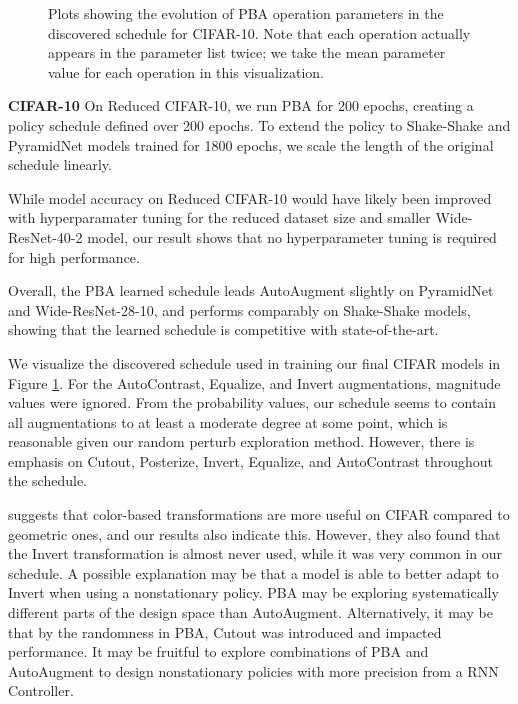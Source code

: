 \documentclass{article}
\begin{document}
\begin{figure}[t]
  \centering
  \begin{subfigure}[Operation magnitudes increase rapidly in the initial phase of training, eventually reaching a steady state around epoch 130.]{
  \texttt{[image: figures/cifar-mag.png]}
  }
  \end{subfigure}
  \begin{subfigure}[Normalized plot of operation probability parameters over time. The distribution flattens out towards the end of training.]{
  \texttt{[image: figures/cifar-prob.png]}
  }
  \end{subfigure}
  \caption{Plots showing the evolution of PBA operation parameters in the discovered schedule for CIFAR-10. Note that each operation actually appears in the parameter list twice; we take the mean parameter value for each operation in this visualization.}
  \label{fig:pba-schedule}
\end{figure}

\textbf{CIFAR-10}
On Reduced CIFAR-10, we run PBA for 200 epochs, creating a policy schedule defined over 200 epochs. To extend the policy to Shake-Shake and PyramidNet models trained for 1800 epochs, we scale the length of the original schedule linearly.

While model accuracy on Reduced CIFAR-10 would have likely been improved with hyperparamater tuning for the reduced dataset size and smaller Wide-ResNet-40-2 model, our result shows that no hyperparameter tuning is required for high performance. 

Overall, the PBA learned schedule leads AutoAugment slightly on PyramidNet and Wide-ResNet-28-10, and performs comparably on Shake-Shake models, showing that the learned schedule is competitive with state-of-the-art.

We visualize the discovered schedule used in training our final CIFAR models in Figure \ref{fig:pba-schedule}. For the AutoContrast, Equalize, and Invert augmentations, magnitude values were ignored. From the probability values, our schedule seems to contain all augmentations to at least a moderate degree at some point, which is reasonable given our random perturb exploration method. However, there is emphasis on Cutout, Posterize, Invert, Equalize, and AutoContrast throughout the schedule. 

\cite{autoaug} suggests that color-based transformations are more useful on CIFAR compared to geometric ones, and our results also indicate this. However, they also found that the Invert transformation is almost never used, while it was very common in our schedule. A possible explanation may be that a model is able to better adapt to Invert when using a nonstationary policy. PBA may be exploring systematically different parts of the design space than AutoAugment. Alternatively, it may be that by the randomness in PBA, Cutout was introduced and impacted performance. It may be fruitful to explore combinations of PBA and AutoAugment to design nonstationary policies with more precision from a RNN Controller.
\end{document}
